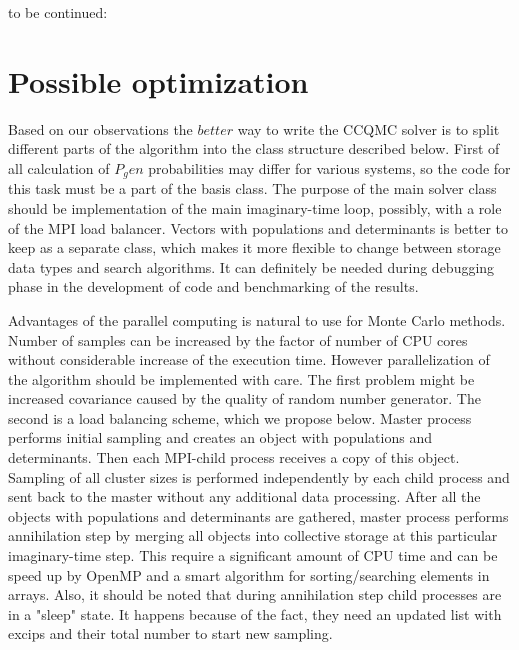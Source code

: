 \documentclass[twoside,english]{uiofysmaster}
\begin{document}
to be continued:\\

% 
%








\section{Possible optimization}
Based on our observations the $better$ way to write the CCQMC solver is to split different parts of the algorithm into the class structure described below.
First of all calculation of $P_gen$ probabilities may differ for various systems, so the code for this task must be a part of the basis class.
The purpose of the main solver class should be implementation of the main imaginary-time loop, possibly, with a role of the MPI load balancer.
Vectors with populations and determinants is better to keep as a separate class, which makes it more flexible to change between storage data types and search algorithms. It can definitely be needed during debugging phase in the development of code and benchmarking of the results.

Advantages of the parallel computing is natural to use for Monte Carlo methods. Number of samples can be increased by the factor of number of CPU cores without considerable increase of the execution time. However parallelization of the algorithm should be implemented with care. The first problem might be increased covariance caused by the quality of random number generator. The second is a load balancing scheme, which we propose below.
Master process performs initial sampling and creates an object with populations and determinants. Then each MPI-child process receives a copy of this object. Sampling of all cluster sizes is performed independently by each child process and sent back to the master without any additional data processing.
After all the objects with populations and determinants are gathered, master process performs annihilation step by merging all objects into collective storage at this particular imaginary-time step. This require a significant amount of CPU time and can be speed up by OpenMP and a smart algorithm for sorting/searching elements in arrays. 
Also, it should be noted that during annihilation step child processes are in a "sleep" state. It happens because of the fact, they need an updated list with excips and their total number to start new sampling.
\end{document}
